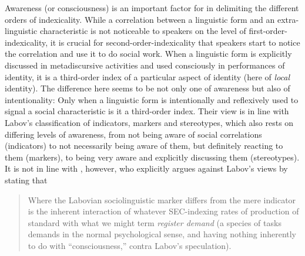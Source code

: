 Awareness (or consciousness) is an important factor for \citet{Johnstone2006} in delimiting the different orders of indexicality. While a correlation between a linguistic form and an extra-linguistic characteristic is not noticeable to speakers on the level of first-order-indexicality, it is crucial for second-order-indexicality that speakers start to notice the correlation and use it to do social work. When a linguistic form is explicitly discussed in metadiscursive activities and used consciously in performances of identity, it is a third-order index of a particular aspect of identity (here of \emph{local} identity). The difference here seems to be not only one of awareness but also of intentionality: Only when a linguistic form is intentionally and reflexively used to signal a social characteristic is it a third-order index. Their view is in line with Labov’s classification of indicators, markers and stereotypes, which also rests on differing levels of awareness, from not being aware of social correlations (indicators) to not necessarily being aware of them, but definitely reacting to them (markers), to being very aware and explicitly discussing them (stereotypes). It is not in line with \citet{Silverstein2003}, however, who explicitly argues against Labov’s views by stating that

\begin{quote}
Where the Labovian sociolinguistic marker differs from the mere indicator is the inherent interaction of whatever SEC-indexing rates of production of standard with what we might term \emph{register demand} (a species of tasks demands in the normal psychological sense, and having nothing inherently to do with “consciousness,” contra Labov’s speculation). \citep[218]{Silverstein2003}
\end{quote}


